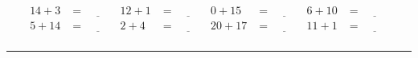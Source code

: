 \documentclass{article}
\begin{document}
\begin{sloppy}
\begin{align*}
    {14} + {3} &= \underline{\hspace{1cm}} & {12} + {1} &= \underline{\hspace{1cm}} & {0} + {15} &= \underline{\hspace{1cm}} & {6} + {10} &= \underline{\hspace{1cm}} \\
    {5} + {14} &= \underline{\hspace{1cm}} & {2} + {4} &= \underline{\hspace{1cm}} & {20} + {17} &= \underline{\hspace{1cm}} & {11} + {1} &= \underline{\hspace{1cm}} \\
\end{align*}
\hrule
\end{sloppy}
\end{document}
